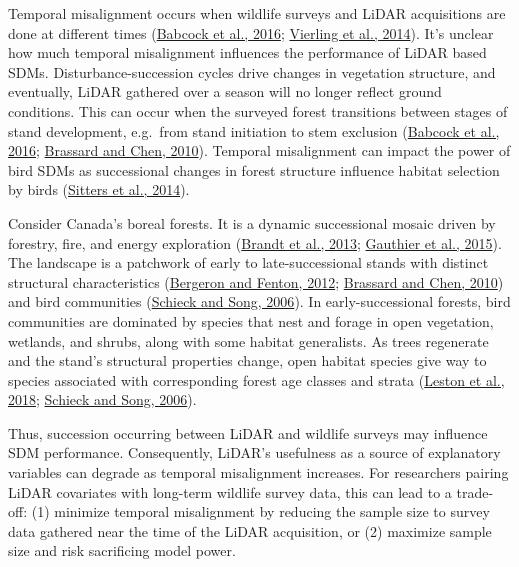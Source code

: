 \documentclass[
  12pt,
]{article}
\begin{document}
Temporal misalignment occurs when wildlife surveys and LiDAR acquisitions are done at different times (\protect\hyperlink{ref-babcockModelingForestBiomass2016}{Babcock et al., 2016}; \protect\hyperlink{ref-VierlingSwift2014}{Vierling et al., 2014}). It's unclear how much temporal misalignment influences the performance of LiDAR based SDMs. Disturbance-succession cycles drive changes in vegetation structure, and eventually, LiDAR gathered over a season will no longer reflect ground conditions. This can occur when the surveyed forest transitions between stages of stand development, e.g.~from stand initiation to stem exclusion (\protect\hyperlink{ref-babcockModelingForestBiomass2016}{Babcock et al., 2016}; \protect\hyperlink{ref-brassardStandStructureComposition2010}{Brassard and Chen, 2010}). Temporal misalignment can impact the power of bird SDMs as successional changes in forest structure influence habitat selection by birds (\protect\hyperlink{ref-sittersAssociationsOccupancyHabitat2014}{Sitters et al., 2014}).

Consider Canada's boreal forests. It is a dynamic successional mosaic driven by forestry, fire, and energy exploration (\protect\hyperlink{ref-Brandt2013}{Brandt et al., 2013}; \protect\hyperlink{ref-gauthierBorealForestHealth2015}{Gauthier et al., 2015}). The landscape is a patchwork of early to late-successional stands with distinct structural characteristics (\protect\hyperlink{ref-Bergeron2012}{Bergeron and Fenton, 2012}; \protect\hyperlink{ref-brassardStandStructureComposition2010}{Brassard and Chen, 2010}) and bird communities (\protect\hyperlink{ref-Schieck2006}{Schieck and Song, 2006}). In early-successional forests, bird communities are dominated by species that nest and forage in open vegetation, wetlands, and shrubs, along with some habitat generalists. As trees regenerate and the stand's structural properties change, open habitat species give way to species associated with corresponding forest age classes and strata (\protect\hyperlink{ref-lestonLongtermChangesBoreal2018}{Leston et al., 2018}; \protect\hyperlink{ref-Schieck2006}{Schieck and Song, 2006}).

Thus, succession occurring between LiDAR and wildlife surveys may influence SDM performance. Consequently, LiDAR's usefulness as a source of explanatory variables can degrade as temporal misalignment increases. For researchers pairing LiDAR covariates with long-term wildlife survey data, this can lead to a trade-off: (1) minimize temporal misalignment by reducing the sample size to survey data gathered near the time of the LiDAR acquisition, or (2) maximize sample size and risk sacrificing model power.
\end{document}
